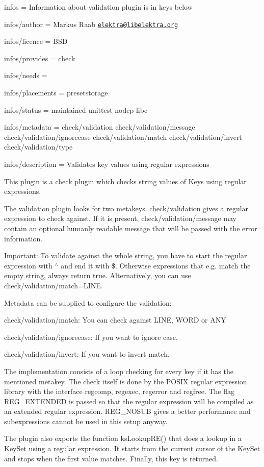 
\begin{DoxyItemize}
\item infos = Information about validation plugin is in keys below
\item infos/author = Markus Raab \href{mailto:elektra@libelektra.org}{\tt elektra@libelektra.\+org}
\item infos/licence = B\+SD
\item infos/provides = check
\item infos/needs =
\item infos/placements = presetstorage
\item infos/status = maintained unittest nodep libc
\item infos/metadata = check/validation check/validation/message check/validation/ignorecase check/validation/match check/validation/invert check/validation/type
\item infos/description = Validates key values using regular expressions
\end{DoxyItemize}

This plugin is a check plugin which checks string values of Keys using regular expressions.

The validation plugin looks for two metakeys. {\ttfamily check/validation} gives a regular expression to check against. If it is present, {\ttfamily check/validation/message} may contain an optional humanly readable message that will be passed with the error information.

Important\+: To validate against the whole string, you have to start the regular expression with {\ttfamily $^\wedge$} and end it with {\ttfamily \$}. Otherwise expressions that e.\+g. match the empty string, always return true. Alternatively, you can use {\ttfamily check/validation/match=L\+I\+NE}.

Metadata can be supplied to configure the validation\+:


\begin{DoxyItemize}
\item {\ttfamily check/validation/match}\+: You can check against {\ttfamily L\+I\+NE}, {\ttfamily W\+O\+RD} or {\ttfamily A\+NY}
\item {\ttfamily check/validation/ignorecase}\+: If you want to ignore case.
\item {\ttfamily check/validation/invert}\+: If you want to invert match.
\end{DoxyItemize}

The implementation consists of a loop checking for every key if it has the mentioned metakey. The check itself is done by the P\+O\+S\+IX regular expression library with the interface {\ttfamily regcomp}, {\ttfamily regexec}, {\ttfamily regerror} and {\ttfamily regfree}. The flag {\ttfamily R\+E\+G\+\_\+\+E\+X\+T\+E\+N\+D\+ED} is passed so that the regular expression will be compiled as an extended regular expression. {\ttfamily R\+E\+G\+\_\+\+N\+O\+S\+UB} gives a better performance and subexpressions cannot be used in this setup anyway.

The plugin also exports the function {\ttfamily ks\+Lookup\+R\+E()} that does a lookup in a Key\+Set using a regular expression. It starts from the current cursor of the Key\+Set and stops when the first value matches. Finally, this key is returned. 